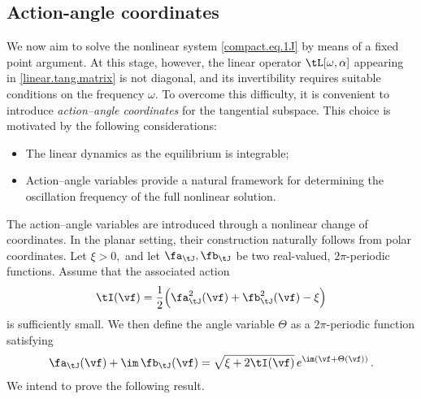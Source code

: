 \documentclass[a4paper,reqno,10pt]{article}
\begin{document}
\subsection{Action-angle coordinates} We now aim to solve the nonlinear system \eqref{compact.eq.1J} by means of  a fixed point argument. At this stage, however, the linear operator $\tL[\omega,\alpha]$ appearing in \eqref{linear.tang.matrix} is not diagonal, and its invertibility requires suitable conditions  on the frequency $\omega$. To overcome this difficulty, it is convenient to introduce {\it action–angle coordinates} for the tangential subspace. This choice is motivated by the following considerations:
\begin{itemize}
	\item The linear dynamics as the equilibrium is integrable;
	\item Action–angle variables provide a natural framework for determining the oscillation frequency of the full nonlinear solution.

\end{itemize}
The action–angle variables are introduced through a nonlinear change of coordinates. In the planar setting, their construction naturally follows from polar coordinates.
Let $\xi > 0,$ and let $ \fa_{\tJ}, \fb_{\tJ} $ be two real-valued, $2\pi$-periodic functions. Assume that the associated action
\[
\tI(\vf)
=
\frac{1}{2}\Big( \fa_{\tJ}^2(\vf) + \fb_{\tJ}^2(\vf) - \xi \Big)
\]
is sufficiently small.
We then define the angle variable $\Theta$ as a $2\pi$-periodic function satisfying
\begin{align}\label{action.angle}
\fa_{\tJ}(\vf) + \im\,\fb_{\tJ}(\vf)
=
\sqrt{\xi + 2\tI(\vf)}\,
e^{\im(\vf + \Theta(\vf))}\,.
\end{align}
We intend to prove the following result.
\end{document}
